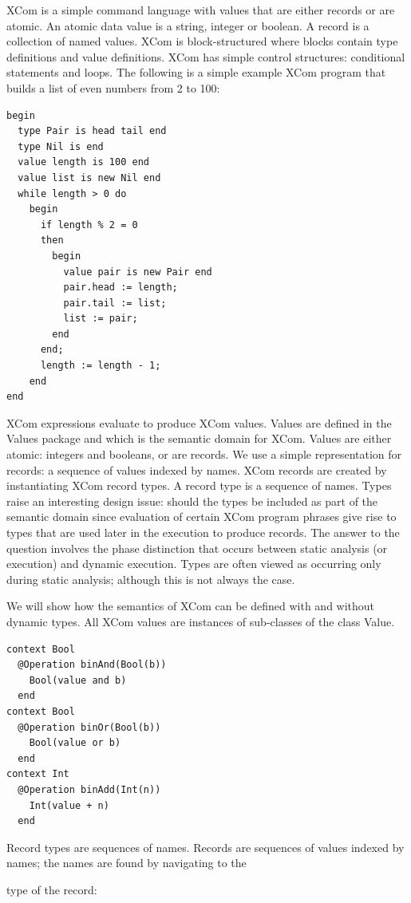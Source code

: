 XCom is a simple command language with values that are either records
or are atomic. An atomic data value is a string, integer or boolean.
A record is a collection of named values. XCom is block-structured
where blocks contain type definitions and value definitions. XCom
has simple control structures: conditional statements and loops. The
following is a simple example XCom program that builds a list of even
numbers from 2 to 100:

\begin{lstlisting}
begin
  type Pair is head tail end
  type Nil is end
  value length is 100 end
  value list is new Nil end
  while length > 0 do
    begin
      if length % 2 = 0
      then
        begin
          value pair is new Pair end
          pair.head := length;
          pair.tail := list;
          list := pair;
        end
      end;
      length := length - 1;
    end
end
\end{lstlisting}XCom expressions evaluate to produce XCom values. Values are defined
in the Values package and which is the 
semantic domain for XCom. Values are either atomic: integers and
booleans, or are records. We use a simple representation for records:
a sequence of values indexed by names. XCom records are created by
instantiating XCom record types. A record type is a sequence of names.
Types raise an interesting design issue: should the types be included
as part of the semantic domain since evaluation of certain XCom program
phrases give rise to types that are used later in the execution to
produce records. The answer to the question involves the phase distinction
that occurs between static analysis (or execution)
and dynamic execution. Types are often viewed
as occurring only during static analysis; although this is not always
the case.

We will show how the semantics of XCom can be defined with and without
dynamic types. All XCom values are instances of sub-classes of the class
Value.

\begin{lstlisting}
context Bool
  @Operation binAnd(Bool(b))
    Bool(value and b)
  end
context Bool
  @Operation binOr(Bool(b))
    Bool(value or b)
  end
context Int
  @Operation binAdd(Int(n))
    Int(value + n)
  end
\end{lstlisting}Record types are sequences of names. Records are sequences of values
indexed by names; the names are found by navigating to the

type of the record:

